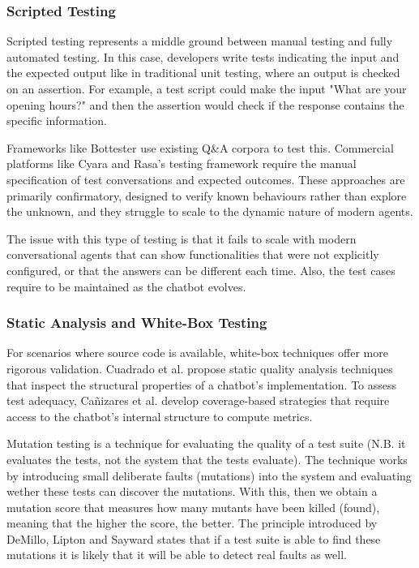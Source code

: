 \subsubsection{Scripted Testing}

Scripted testing represents a middle ground
between manual testing and fully automated testing.
In this case, developers write tests
indicating the input and the expected output
like in traditional unit testing,
where an output is checked on an assertion.
For example, a test script could make the input
"What are your opening hours?"
and then the assertion would check
if the response contains the specific information.

Frameworks like Bottester
\autocite{vasconcelosBottesterTestingConversational2017}
use existing Q\&A corpora to test this.
Commercial platforms like Cyara \autocite{CyaraBotium}
and Rasa's testing framework \autocite{RasaTest2025}
require the manual specification of test conversations and expected outcomes.
These approaches are primarily confirmatory,
designed to verify known behaviours rather than explore the unknown,
and they struggle to scale to the dynamic nature of modern agents.

The issue with this type of testing
is that it fails to scale with modern conversational agents
that can show functionalities that were not explicitly configured,
or that the answers can be different each time.
Also, the test cases require to be maintained
as the chatbot evolves.

\subsubsection{Static Analysis and White-Box Testing}

For scenarios where source code is available,
white-box techniques offer more rigorous validation.
Cuadrado et al. \autocite{cuadradoIntegratingStaticQuality2024}
propose static quality analysis techniques
that inspect the structural properties of a chatbot's implementation.
To assess test adequacy, Cañizares et al.
\autocite{canizaresCoveragebasedStrategiesAutomated2024}
develop coverage-based strategies that
require access to the chatbot's internal structure to compute metrics.

Mutation testing is a technique for evaluating
the quality of a test suite
(N.B. it evaluates the tests, not the system that the tests evaluate).
The technique works by introducing
small deliberate faults (mutations) into the system
and evaluating wether these tests can discover the mutations.
With this, then we obtain a mutation score
that measures how many mutants have been killed (found),
meaning that the higher the score, the better.
The principle introduced by DeMillo, Lipton and Sayward
\autocite{demilloHintsTestData1978}
states that if a test suite is able to find these mutations
it is likely that it will be able to detect real faults as well.

